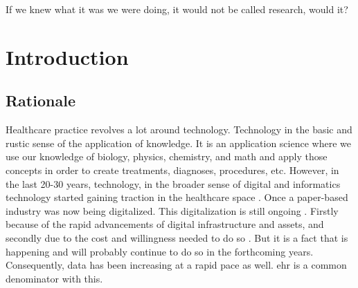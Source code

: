 \begin{savequote}[75mm]
If we knew what it was we were doing, it would not be called research, would it?
\end{savequote}
\chapter{Introduction} \label{chap:intro}

\section{Rationale}
Healthcare practice revolves a lot around technology. Technology in the basic and rustic sense of the application of knowledge. It is an application science where we use our knowledge of biology, physics, chemistry, and math and apply those concepts in order to create treatments, diagnoses, procedures, etc.
However, in the last 20-30 years, technology, in the broader sense of digital and informatics technology started gaining traction in the healthcare space \cite{adler-milsteinHITECHActDrove2017}. Once a paper-based industry was now being digitalized. This digitalization is still ongoing \cite{abul-husnPersonalizedMedicinePower2019}. Firstly because of the rapid advancements of digital infrastructure and assets, and secondly due to the cost and willingness needed to do so \cite{kruseUseElectronicHealth2018,palabindalaAdoptionElectronicHealth2016}. But it is a fact that is happening and will probably continue to do so in the forthcoming years. Consequently, data has been increasing at a rapid pace as well. \ac{ehr} is a common denominator with this.

